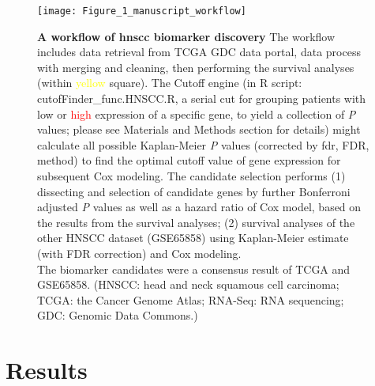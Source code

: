 \documentclass[jpm,article,submit,moreauthors,pdftex]{Definitions/mdpi}
\newcommand{\bcaption}[2]{\caption{\textbf{#1} #2}}
\begin{document}
\begin{figure}[hbt!]
\centering
\texttt{[image: Figure\_1\_manuscript\_workflow]} %
\bcaption{A workflow of \acrshort{hnscc} biomarker discovery}
{The workflow includes data retrieval from TCGA GDC data portal, data process with merging and cleaning, then performing the survival analyses (within \textcolor{yellow}{yellow} square). The Cutoff engine (in R script: cutofFinder\_func.HNSCC.R, a serial cut for grouping patients with \textcolor{asparagus}{low} or \textcolor{red}{high} expression of a specific gene, to yield a collection of \textit{P} values; please see Materials and Methods section for details) might calculate all possible Kaplan-Meier \textit{P} values (corrected by \acrlong{fdr}, FDR, method) to find the optimal cutoff value of gene expression for subsequent Cox modeling.
The candidate selection performs (1) dissecting and selection of candidate genes by further Bonferroni adjusted \textit{P} values as well as a hazard ratio of Cox model, based on the results from the survival analyses;
(2) survival analyses of the other HNSCC dataset (GSE65858) using Kaplan-Meier estimate (with FDR correction) and Cox modeling.\\
The biomarker candidates were a consensus result of TCGA and GSE65858. 
(HNSCC: head and neck squamous cell carcinoma; TCGA: the Cancer Genome Atlas; RNA-Seq: RNA sequencing; GDC: Genomic Data Commons.)}
\label{fig:figure1}


\end{figure}


\clearpage %




\section{Results}
\end{document}

